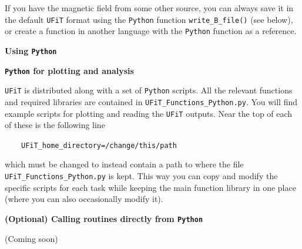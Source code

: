 \documentclass[12pt,twoside]{article}
\begin{document}
If you have the magnetic field from some other source, you can always save it in the default \texttt{UFiT} format using the \texttt{Python} function \texttt{write\_B\_file()} (see below), or create a function in another language with the \texttt{Python} function as a reference.


\vspace{2mm}
{\Large \textbf{Using \texttt{Python}}}

\vspace{2mm}
{\large \textbf{\texttt{Python} for plotting and analysis}}

\texttt{UFiT} is distributed along with a set of \texttt{Python} scripts. All the relevant functions and required libraries are contained in \texttt{UFiT\_Functions\_Python.py}. You will find example scripts for plotting and reading the \texttt{UFiT} outputs. Near the top of each of these is the following line

$\quad\quad$\texttt{UFiT\_home\_directory=\textquotesingle /change/this/path\textquotesingle }

which must be changed to instead contain a path to where the file \texttt{UFiT\_Functions\_Python.py} is kept. This way you can copy and modify the specific scripts for each task while keeping the main function library in one place (where you can also occasionally modify it).


\vspace{2mm}
{\large \textbf{(Optional) Calling routines directly from \texttt{Python}}}

(Coming soon)
\end{document}
